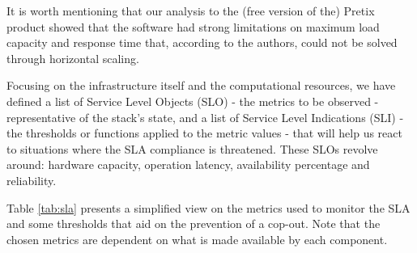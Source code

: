 \documentclass[12pt]{article}
\begin{document}
It is worth mentioning that our analysis to the (free version of the) Pretix product showed that the software had strong limitations on maximum load capacity
and response time that, according to the authors, could not be solved through horizontal scaling.

Focusing on the infrastructure itself and the computational resources, we have defined a list of Service Level Objects (SLO) - the metrics to be observed -
representative of the stack's state, and a list of Service Level Indications (SLI) - the thresholds or functions applied to the metric values - that will
help us react to situations where the SLA compliance is threatened.
These SLOs revolve around: hardware capacity, operation latency, availability percentage and reliability.

Table \ref{tab:sla} presents a simplified view on the metrics used to monitor the SLA and some thresholds that aid on the prevention of a cop-out.
Note that the chosen metrics are dependent on what is made available by each component.
\end{document}
